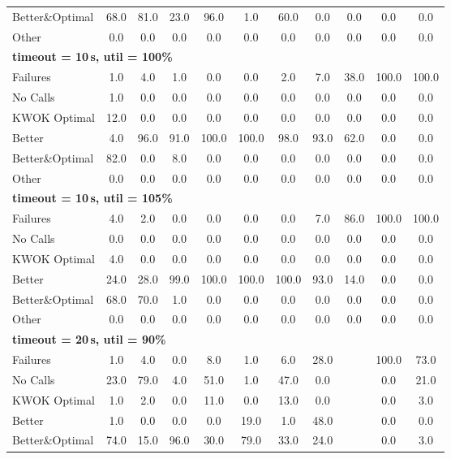 \begin{tabular}{l cccccccccc}
Better\&Optimal & 68.0 & 81.0 & 23.0 & 96.0 & 1.0 & 60.0 & 0.0 & 0.0 & 0.0 & 0.0 \\
Other & 0.0 & 0.0 & 0.0 & 0.0 & 0.0 & 0.0 & 0.0 & 0.0 & 0.0 & 0.0 \\
\midrule
\multicolumn{11}{l}{\textbf{timeout = 10\,s, util = 100\%}} \\
\midrule
Failures & 1.0 & 4.0 & 1.0 & 0.0 & 0.0 & 2.0 & 7.0 & 38.0 & 100.0 & 100.0 \\
No Calls & 1.0 & 0.0 & 0.0 & 0.0 & 0.0 & 0.0 & 0.0 & 0.0 & 0.0 & 0.0 \\
KWOK Optimal & 12.0 & 0.0 & 0.0 & 0.0 & 0.0 & 0.0 & 0.0 & 0.0 & 0.0 & 0.0 \\
Better & 4.0 & 96.0 & 91.0 & 100.0 & 100.0 & 98.0 & 93.0 & 62.0 & 0.0 & 0.0 \\
Better\&Optimal & 82.0 & 0.0 & 8.0 & 0.0 & 0.0 & 0.0 & 0.0 & 0.0 & 0.0 & 0.0 \\
Other & 0.0 & 0.0 & 0.0 & 0.0 & 0.0 & 0.0 & 0.0 & 0.0 & 0.0 & 0.0 \\
\midrule
\multicolumn{11}{l}{\textbf{timeout = 10\,s, util = 105\%}} \\
\midrule
Failures & 4.0 & 2.0 & 0.0 & 0.0 & 0.0 & 0.0 & 7.0 & 86.0 & 100.0 & 100.0 \\
No Calls & 0.0 & 0.0 & 0.0 & 0.0 & 0.0 & 0.0 & 0.0 & 0.0 & 0.0 & 0.0 \\
KWOK Optimal & 4.0 & 0.0 & 0.0 & 0.0 & 0.0 & 0.0 & 0.0 & 0.0 & 0.0 & 0.0 \\
Better & 24.0 & 28.0 & 99.0 & 100.0 & 100.0 & 100.0 & 93.0 & 14.0 & 0.0 & 0.0 \\
Better\&Optimal & 68.0 & 70.0 & 1.0 & 0.0 & 0.0 & 0.0 & 0.0 & 0.0 & 0.0 & 0.0 \\
Other & 0.0 & 0.0 & 0.0 & 0.0 & 0.0 & 0.0 & 0.0 & 0.0 & 0.0 & 0.0 \\
\midrule
\multicolumn{11}{l}{\textbf{timeout = 20\,s, util = 90\%}} \\
\midrule
Failures & 1.0 & 4.0 & 0.0 & 8.0 & 1.0 & 6.0 & 28.0 & \text{--} & 100.0 & 73.0 \\
No Calls & 23.0 & 79.0 & 4.0 & 51.0 & 1.0 & 47.0 & 0.0 & \text{--} & 0.0 & 21.0 \\
KWOK Optimal & 1.0 & 2.0 & 0.0 & 11.0 & 0.0 & 13.0 & 0.0 & \text{--} & 0.0 & 3.0 \\
Better & 1.0 & 0.0 & 0.0 & 0.0 & 19.0 & 1.0 & 48.0 & \text{--} & 0.0 & 0.0 \\
Better\&Optimal & 74.0 & 15.0 & 96.0 & 30.0 & 79.0 & 33.0 & 24.0 & \text{--} & 0.0 & 3.0 \\

\end{tabular}
